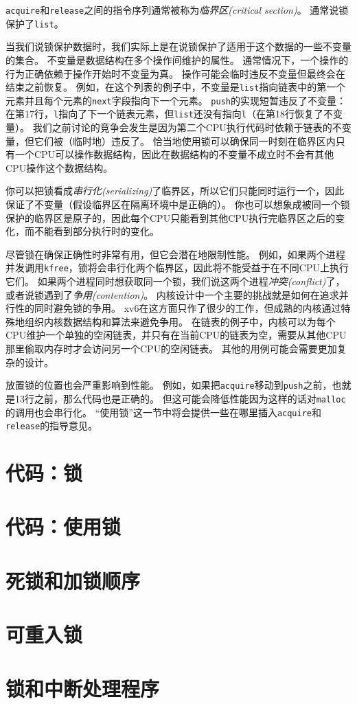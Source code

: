 \texttt{acquire}和\texttt{release}之间的指令序列通常被称为\emph{临界区(critical section)}。
通常说锁保护了\texttt{list}。

当我们说锁保护数据时，我们实际上是在说锁保护了适用于这个数据的一些不变量的集合。
不变量是数据结构在多个操作间维护的属性。
通常情况下，一个操作的行为正确依赖于操作开始时不变量为真。
操作可能会临时违反不变量但最终会在结束之前恢复。
例如，在这个列表的例子中，不变量是\texttt{list}指向链表中的第一个元素并且每个元素的\texttt{next}字段指向下一个元素。
\texttt{push}的实现短暂违反了不变量：在第17行，\texttt{l}指向了下一个链表元素，但\texttt{list}还没有指向\texttt{l}（在第18行恢复了不变量）。
我们之前讨论的竞争会发生是因为第二个CPU执行代码时依赖于链表的不变量，但它们被（临时地）违反了。
恰当地使用锁可以确保同一时刻在临界区内只有一个CPU可以操作数据结构，因此在数据结构的不变量不成立时不会有其他CPU操作这个数据结构。

你可以把锁看成\emph{串行化(serializing)}了临界区，所以它们只能同时运行一个，因此保证了不变量（假设临界区在隔离环境中是正确的）。
你也可以想象成被同一个锁保护的临界区是原子的，因此每个CPU只能看到其他CPU执行完临界区之后的变化，而不能看到部分执行时的变化。

尽管锁在确保正确性时非常有用，但它会潜在地限制性能。
例如，如果两个进程并发调用\texttt{kfree}，锁将会串行化两个临界区，因此将不能受益于在不同CPU上执行它们。
如果两个进程同时想获取同一个锁，我们说这两个进程\emph{冲突(conflict)}了，或者说锁遇到了\emph{争用(contention)}。
内核设计中一个主要的挑战就是如何在追求并行性的同时避免锁的争用。
xv6在这方面只作了很少的工作，但成熟的内核通过特殊地组织内核数据结构和算法来避免争用。
在链表的例子中，内核可以为每个CPU维护一个单独的空闲链表，并只有在当前CPU的链表为空，需要从其他CPU那里偷取内存时才会访问另一个CPU的空闲链表。
其他的用例可能会需要更加复杂的设计。

放置锁的位置也会严重影响到性能。
例如，如果把\texttt{acquire}移动到\texttt{push}之前，也就是13行之前，那么代码也是正确的。
但这可能会降低性能因为这样的话对\texttt{malloc}的调用也会串行化。
“使用锁”这一节中将会提供一些在哪里插入\texttt{acquire}和\texttt{release}的指导意见。

\section{代码：锁}

\section{代码：使用锁}

\section{死锁和加锁顺序}

\section{可重入锁}

\section{锁和中断处理程序}\label{s6-6}
